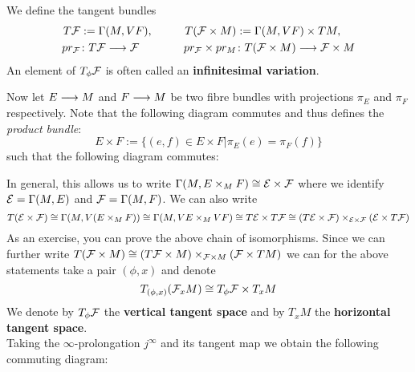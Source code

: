 \begin{definition}
  We define the tangent bundles
  \begin{align}
    T{\mathcal{F}} &:= \Gamma(M, VF), \quad &\quad T({\mathcal{F}}\times M) &:= \Gamma(M, VF) \times TM,\\
    pr_\mathcal{F} &\colon T{\mathcal{F}} \longrightarrow {\mathcal{F}} & pr_{{\mathcal{F}}} \times pr_M &\colon T({\mathcal{F}}\times M) \longrightarrow {\mathcal{F}} \times M
  \end{align}
  An element of $T_\phi\FF$ is often called an \textbf{infinitesimal variation}.
\end{definition}

Now let $E \longrightarrow M$ and $F\longrightarrow M$ be two fibre bundles with projections $\pi_E$ and $\pi_F$ respectively. Note that the following diagram commutes and thus defines the \emph{product bundle}:
$$ E\times F := \{ (e,f) \in E\times F \big| \pi_E(e)=\pi_F(f) \} $$
such that the following diagram commutes:
\begin{center}
\end{center}

In general, this allows us to write $\Gamma(M, E \times_M F) \cong {\mathcal{E}} \times {\mathcal{F}}$ where we identify ${\mathcal{E}} = \Gamma(M,E)$ and ${\mathcal{F}} = \Gamma(M,F)$. We can also write
$$T({\mathcal{E}} \times {\mathcal{F}}) \cong \Gamma(M, V(E\times_M F)) \cong \Gamma(M, VE \times_M VF) \cong T{\mathcal{E}} \times T{\mathcal{F}} \cong (T{\mathcal{E}} \times {\mathcal{F}}) \times_{{\mathcal{E}}\times{\mathcal{F}}} ({\mathcal{E}}\times T{\mathcal{F}}) $$
As an exercise, you can prove the above chain of isomorphisms. Since we can further write $T({\mathcal{F}}\times M) \cong (T{\mathcal{F}} \times M) \times_{{\mathcal{F}}\times M} ({\mathcal{F}} \times TM)$ we can for the above statements take a pair $(\phi, x)$ and denote
$$ T_{(\phi, x)}(\FF_x M) \cong T_\phi \FF \times T_x M $$
We denote by $T_\phi \FF$ the \textbf{vertical tangent space} and by $T_x M$ the \textbf{horizontal tangent space}.\\

Taking the $\infty$-prolongation $j^\infty$ and its tangent map we obtain the following commuting diagram:
\begin{center}
\end{center}

